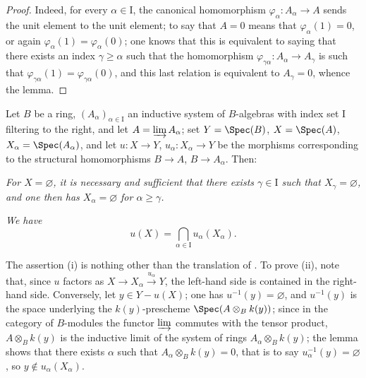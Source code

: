 \begin{proof}
Indeed, for every $\alpha\in\mathrm{I}$, the canonical homomorphism $\varphi_\alpha:A_\alpha\to A$ sends the unit element to the unit element; to say that $A=0$ means that $\varphi_\alpha(1)=0$, or again $\varphi_\alpha(1)=\varphi_\alpha(0)$; one knows that this is equivalent to saying that there exists an index $\gamma\geq\alpha$ such that the homomorphism $\varphi_{\gamma\alpha}:A_\alpha\to A_\gamma$ is such that $\varphi_{\gamma\alpha}(1)=\varphi_{\gamma\alpha}(0)$, and this last relation is equivalent to $A_\gamma=0$, whence the lemma.
\end{proof}

\begin{proposition}[1.9.2]
\label{IV.1.9.2}
Let $B$ be a ring, $(A_\alpha)_{\alpha\in\mathrm{I}}$ an inductive system of $B$-algebras with index set $\mathrm{I}$ filtering to the right, and let $A=\varinjlim A_\alpha$; set $Y=\Spec(B)$, $X=\Spec(A)$, $X_\alpha=\Spec(A_\alpha)$, and let $u:X\to Y$, $u_\alpha:X_\alpha\to Y$ be the morphisms corresponding to the structural homomorphisms $B\to A$, $B\to A_\alpha$.
Then:
\end{proposition}

\begin{env}[1.9.2.i]
\label{IV.1.9.2.i}
\emph{For $X=\varnothing$, it is necessary and sufficient that there exists $\gamma\in\mathrm{I}$ such that $X_\gamma=\varnothing$, and one then has $X_\alpha=\varnothing$ for $\alpha\geq\gamma$.}
\end{env}


\begin{env}[1.9.2.ii]
\label{IV.1.9.2.ii}
\emph{We have}
\[
  u(X)=\bigcap_{\alpha\in\mathrm{I}} u_\alpha(X_\alpha). \tag{1.9.2.1}
\label{IV.1.9.2.1}
\]
\end{env}

The assertion (i) is nothing other than the translation of .
To prove (ii), note that, since $u$ factors as $X\longrightarrow X_\alpha\xrightarrow{u_\alpha}Y$, the left-hand side is contained in the right-hand side.
Conversely, let $y\in Y-u(X)$; one has $u^{-1}(y)=\varnothing$, and $u^{-1}(y)$ is the space underlying the $k(y)$-prescheme $\Spec(A\otimes_B k(y))$; since in the category of $B$-modules the functor $\varinjlim$ commutes with the tensor product, $A\otimes_B k(y)$ is the inductive limit of the system of rings $A_\alpha\otimes_B k(y)$; the lemma  shows that there exists $\alpha$ such that $A_\alpha\otimes_B k(y)=0$, that is to say $u_\alpha^{-1}(y)=\varnothing$, so $y\notin u_\alpha(X_\alpha)$.

